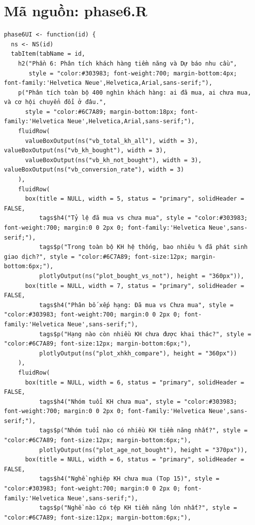 \documentclass[12pt, a4paper]{article}
\begin{document}
\section{Mã nguồn: phase6.R}
\begin{lstlisting}
phase6UI <- function(id) {
  ns <- NS(id)
  tabItem(tabName = id,
    h2("Phần 6: Phân tích khách hàng tiềm năng và Dự báo nhu cầu",
       style = "color:#303983; font-weight:700; margin-bottom:4px; font-family:'Helvetica Neue',Helvetica,Arial,sans-serif;"),
    p("Phân tích toàn bộ 400 nghìn khách hàng: ai đã mua, ai chưa mua, và cơ hội chuyển đổi ở đâu.",
      style = "color:#6C7A89; margin-bottom:18px; font-family:'Helvetica Neue',Helvetica,Arial,sans-serif;"),
    fluidRow(
      valueBoxOutput(ns("vb_total_kh_all"), width = 3), valueBoxOutput(ns("vb_kh_bought"), width = 3),
      valueBoxOutput(ns("vb_kh_not_bought"), width = 3), valueBoxOutput(ns("vb_conversion_rate"), width = 3)
    ),
    fluidRow(
      box(title = NULL, width = 5, status = "primary", solidHeader = FALSE,
          tags$h4("Tỷ lệ đã mua vs chưa mua", style = "color:#303983; font-weight:700; margin:0 0 2px 0; font-family:'Helvetica Neue',sans-serif;"),
          tags$p("Trong toàn bộ KH hệ thống, bao nhiêu % đã phát sinh giao dịch?", style = "color:#6C7A89; font-size:12px; margin-bottom:6px;"),
          plotlyOutput(ns("plot_bought_vs_not"), height = "360px")),
      box(title = NULL, width = 7, status = "primary", solidHeader = FALSE,
          tags$h4("Phân bố xếp hạng: Đã mua vs Chưa mua", style = "color:#303983; font-weight:700; margin:0 0 2px 0; font-family:'Helvetica Neue',sans-serif;"),
          tags$p("Hạng nào còn nhiều KH chưa được khai thác?", style = "color:#6C7A89; font-size:12px; margin-bottom:6px;"),
          plotlyOutput(ns("plot_xhkh_compare"), height = "360px"))
    ),
    fluidRow(
      box(title = NULL, width = 6, status = "primary", solidHeader = FALSE,
          tags$h4("Nhóm tuổi KH chưa mua", style = "color:#303983; font-weight:700; margin:0 0 2px 0; font-family:'Helvetica Neue',sans-serif;"),
          tags$p("Nhóm tuổi nào có nhiều KH tiềm năng nhất?", style = "color:#6C7A89; font-size:12px; margin-bottom:6px;"),
          plotlyOutput(ns("plot_age_not_bought"), height = "370px")),
      box(title = NULL, width = 6, status = "primary", solidHeader = FALSE,
          tags$h4("Nghề nghiệp KH chưa mua (Top 15)", style = "color:#303983; font-weight:700; margin:0 0 2px 0; font-family:'Helvetica Neue',sans-serif;"),
          tags$p("Nghề nào có tệp KH tiềm năng lớn nhất?", style = "color:#6C7A89; font-size:12px; margin-bottom:6px;"),

\end{lstlisting}
\end{document}
